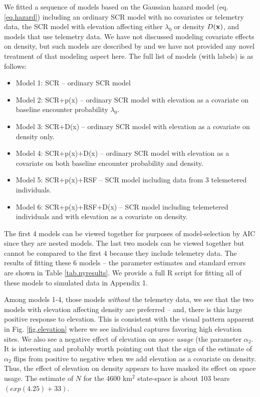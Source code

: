 \documentclass[12pt]{article}
\begin{document}
We fitted a sequence of models based on the Gaussian hazard model
(eq. \ref{eq.hazard})  including an ordinary SCR model with no
covariates or telemetry data, the SCR model with elevation affecting either
$\lambda_{0}$ or density $D({\bf x})$, and models that use telemetry data. We have not discussed modeling
covariate effects on density, but such models are described by
\citet{borchers_efford:2008} and we have not provided any novel
treatment of that modeling aspect here. 
The full list of models (with labels) is as follows:
\begin{itemize}
\item[] Model 1: SCR -- ordinary SCR model 
\item[] Model 2: SCR+p(x) -- ordinary SCR model with elevation as a
  covariate on baseline encounter probability $\lambda_{0}$.
\item[] Model 3: SCR+D(x) -- ordinary SCR model with elevation as a
  covariate on density only.
\item[] Model 4: SCR+p(x)+D(x) -- ordinary SCR model with elevation as
  a covariate on both baseline encounter probability and density.
\item[] Model 5: SCR+p(x)+RSF -- SCR model including data from 3
  telemetered individuals. 
\item[] Model 6: SCR+p(x)+RSF+D(x) -- SCR model including telemetered 
  individuals and with elevation as a covariate on density.
\end{itemize}
The first 4 models can be viewed together for purposes of
model-selection by AIC since they are nested models. The last two
models can be viewed together but cannot be compared to the first 4
because they include telemetry data.
The results of fitting these 6 models -- the parameter estimates and
standard errors are shown in Table \ref{tab.nyresults}.
We provide a full R script for fitting  all of these models to
simulated data in Appendix 1. 


Among models 1-4, those models {\it without} the telemetry data, we
see that the two models with elevation affecting density  are preferred -- and, there is this
large positive response to elevation. This is consistent with the
visual pattern apparent in Fig. \ref{fig.elevation} where we see
individual captures favoring high elevation sites.  We also see a
negative effect of elevation on {\it space usage} (the parameter
$\alpha_{2}$.  It is interesting and probably worth pointing out that
the sign of the estimate of $\alpha_{2}$ flips from positive to
negative when we add elevation as a covariate on density. Thus, the
effect of elevation on density appears to have masked its effect on
space usage.  The estimate of $N$ for the 4600 km$^2$ state-space is
about 103 bears $(exp(4.25)+33)$.
\end{document}
